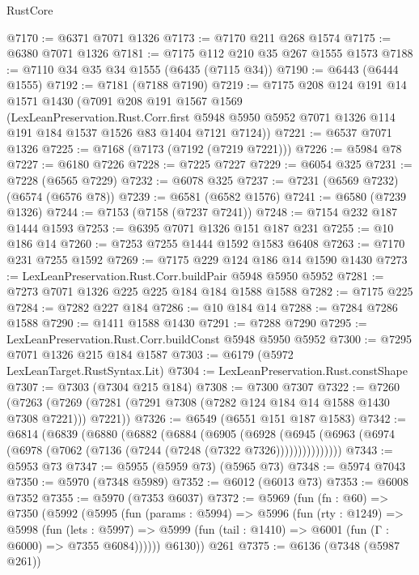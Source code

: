 \begin{lexlean}{RustCore}
\begin{coremodule}
@7170 := @6371 @7071 @1326
@7173 := @7170 @211 @268 @1574
@7175 := @6380 @7071 @1326
@7181 := @7175 @112 @210 @35 @267 @1555 @1573
@7188 := @7110 @34 @35 @34 @1555 (@6435 (@7115 @34))
@7190 := @6443 (@6444 @1555)
@7192 := @7181 (@7188 @7190)
@7219 := @7175
    @208
    @124
    @191
    @14
    @1571
    @1430
    (@7091
      @208
      @191
      @1567
      @1569
      (LexLeanPreservation.Rust.Corr.first
        @5948
        @5950
        @5952
        @7071
        @1326
        @114
        @191
        @184
        @1537
        @1526
        @83
        @1404
        @7121
        @7124))
@7221 := @6537 @7071 @1326
@7225 := @7168 (@7173 (@7192 (@7219 @7221)))
@7226 := @5984 @78
@7227 := @6180 @7226
@7228 := @7225 @7227
@7229 := @6054 @325
@7231 := @7228 (@6565 @7229)
@7232 := @6078 @325
@7237 := @7231 (@6569 @7232) (@6574 (@6576 @78))
@7239 := @6581 (@6582 @1576)
@7241 := @6580 (@7239 @1326)
@7244 := @7153 (@7158 (@7237 @7241))
@7248 := @7154 @232 @187 @1444 @1593
@7253 := @6395 @7071 @1326 @151 @187 @231
@7255 := @10 @186 @14
@7260 := @7253 @7255 @1444 @1592 @1583 @6408
@7263 := @7170 @231 @7255 @1592
@7269 := @7175 @229 @124 @186 @14 @1590 @1430
@7273 := LexLeanPreservation.Rust.Corr.buildPair @5948 @5950 @5952
@7281 := @7273 @7071 @1326 @225 @225 @184 @184 @1588 @1588
@7282 := @7175 @225
@7284 := @7282 @227 @184
@7286 := @10 @184 @14
@7288 := @7284 @7286 @1588
@7290 := @1411 @1588 @1430
@7291 := @7288 @7290
@7295 := LexLeanPreservation.Rust.Corr.buildConst @5948 @5950 @5952
@7300 := @7295 @7071 @1326 @215 @184 @1587
@7303 := @6179 (@5972 LexLeanTarget.RustSyntax.Lit)
@7304 := LexLeanPreservation.Rust.constShape
@7307 := @7303 (@7304 @215 @184)
@7308 := @7300 @7307
@7322 := @7260
    (@7263 (@7269 (@7281 (@7291 @7308 (@7282 @124 @184 @14 @1588 @1430 @7308 @7221))) @7221))
@7326 := @6549 (@6551 @151 @187 @1583)
@7342 := @6814
    (@6839
      (@6880
        (@6882
          (@6884
            (@6905
              (@6928
                (@6945 (@6963 (@6974 (@6978 (@7062 (@7136 (@7244 (@7248 (@7322 @7326)))))))))))))))
@7343 := @5953 @73
@7347 := @5955 (@5959 @73) (@5965 @73)
@7348 := @5974 @7043
@7350 := @5970 (@7348 @5989)
@7352 := @6012 (@6013 @73)
@7353 := @6008 @7352
@7355 := @5970 (@7353 @6037)
@7372 := @5969
    (fun (fn : @60) =>
    @7350
      (@5992
        (@5995
          (fun (params : @5994) =>
          @5996
            (fun (rty : @1249) =>
            @5998
              (fun (lets : @5997) =>
              @5999 (fun (tail : @1410) => @6001 (fun (Γ : @6000) => @7355 @6084))))))
        @6130))
    @261
@7375 := @6136 (@7348 (@5987 @261))

\end{coremodule}
\end{lexlean}
